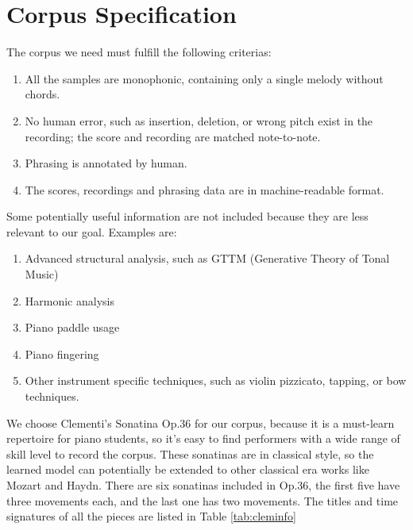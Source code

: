 \section{Corpus Specification}

The corpus we need must fulfill the following criterias:
\begin{enumerate}
   \item All the samples are monophonic, containing only a single melody without chords.
   \item No human error, such as insertion, deletion, or wrong pitch exist in the recording; the score and recording are matched note-to-note.
   \item Phrasing is annotated by human. 
   \item The scores, recordings and phrasing data are in machine-readable format.

\end{enumerate}

Some potentially useful information are not included because they are less relevant to our goal. Examples are:

\begin{enumerate}
   \item Advanced structural analysis, such as GTTM (Generative Theory of Tonal Music)\cite{GTTM}
   \item Harmonic analysis
   \item Piano paddle usage
   \item Piano fingering
   \item Other instrument specific techniques, such as violin pizzicato, tapping, or bow techniques.
\end{enumerate}

We choose Clementi's Sonatina Op.36 for our corpus, because it is a must-learn repertoire for piano students, so it's easy to find performers with a wide range of skill level to record the corpus. These sonatinas are in classical style, so the learned model can potentially be extended to other classical era works like Mozart and Haydn. There are six sonatinas included in Op.36, the first five have three movements each, and the last one has two movements. The titles and time signatures of all the pieces are listed in Table \ref{tab:cleminfo}


